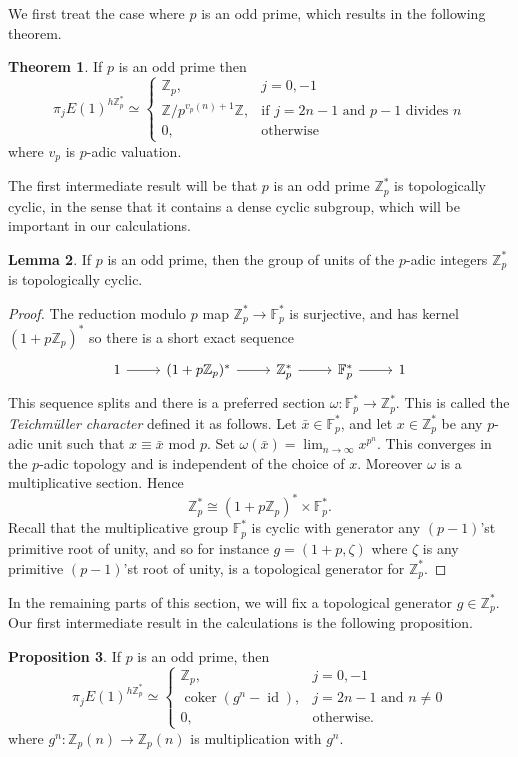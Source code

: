 \documentclass[a4paper]{article} %
\theoremstyle{definition}
\newtheorem{theorem}{Theorem} %
\newtheorem{lemma}[theorem]{Lemma}
\newtheorem{proposition}[theorem]{Proposition}
\newcommand{\Z}{\mathbb{Z}}
\newcommand{\F}{\mathbb{F}}
\DeclareMathOperator{\id}{id}           %
\DeclareMathOperator{\coker}{coker}     %
\begin{document}
We first treat the case where $p$ is an odd prime, which results in the following theorem.
\begin{theorem}
 If $p$ is an odd prime then
 \[
  \pi_j E(1)^{h\Z_p^*} \simeq
    \begin{cases}
    \Z_p, & j=0,-1 \\
    \Z/p^{v_p(n)+1}\Z, & \text{if } j=2n-1 \text{ and } p-1 \text{ divides } n \\
    0, & \text{otherwise}
    \end{cases}
  \]
  where $v_p$ is $p$-adic valuation.
\end{theorem}
The first intermediate result will be that $p$ is an odd prime $\Z_p^*$ is topologically cyclic, in the sense that it contains a dense cyclic subgroup, which will be important in our calculations.
\begin{lemma}
  If $p$ is an odd prime, then the group of units of the $p$-adic integers $\Z_p^*$ is topologically cyclic.
\end{lemma}
\begin{proof}
The reduction modulo $p$ map $\Z_p^* \to \F_p^*$ is surjective, and has kernel $(1+p\Z_p)^*$ so there is a short exact sequence
\[
\begin{tikzcd}
1 \rar & (1+p\Z_p)^* \rar{} & \Z_p^* \rar{} & \F_p^* \rar & 1
\end{tikzcd}
\]
This sequence splits and there is a preferred section $\omega \colon \F_p^* \to \Z_p^*$. This is called the \textit{Teichmüller character} defined it as follows. Let $\bar{x} \in \F_p^*$, and let $x \in \Z_p^*$ be any $p$-adic unit such that $x \equiv \bar{x}$ mod $p$. Set $\omega(\bar{x}) = \lim_{n \to \infty} x^{p^n}$. This converges in the $p$-adic topology and is independent of the choice of $x$.
Moreover $\omega$ is a multiplicative section. Hence
\[
\Z_p^* \cong (1 + p\Z_p)^* \times \F_p^*.
\]
Recall that the multiplicative group $\F_p^*$ is cyclic with generator any $(p-1)$'st primitive root of unity, and so for instance $g = (1+p, \zeta)$ where $\zeta$ is any primitive $(p-1)$'st root of unity, is a topological generator for $\Z_p^*$.
\end{proof}
In the remaining parts of this section, we will fix a topological generator $g \in \Z_p^*$. Our first intermediate result in the calculations is the following proposition.
\begin{proposition}
  If $p$ is an odd prime, then
  \[
   \pi_j E(1)^{h\Z_p^*} \simeq
     \begin{cases}
     \Z_p, & j=0,-1 \\
     \coker (g^n - \id), & j=2n-1 \text{ and } n \neq 0  \\
     0, & \text{otherwise.}
     \end{cases}
   \]
   where $g^n \colon \Z_p(n) \to \Z_p(n)$ is multiplication with $g^n$.
\end{proposition}
\end{document}
